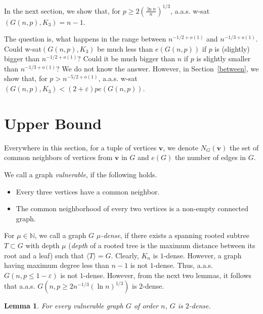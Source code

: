 \documentclass[]{article}
\newtheorem{lemma}[theorem]{Lemma}
\begin{document}
In the next section, we show that, for $p\geq 2\left(\frac{\ln n}{n}\right)^{1/3}$, a.a.s. w-sat$(G(n,p),K_3)=n-1$. 

The question is, what happens in the range between $n^{-1/2+o(1)}$ and $n^{-1/3+o(1)}$. Could w-sat$(G(n,p),K_3)$ be much less than $e(G(n,p))$ if $p$ is (slightly) bigger than $n^{-1/2+o(1)}$? Could it be much bigger than $n$ if $p$ is slightly smaller than $n^{-1/3+o(1)}$? We do not know the answer. However, in Section~\ref{between}, we show that, for $p>n^{-5/2+o(1)}$, a.a.s. w-sat$(G(n,p),K_3)<(2+\varepsilon)p e(G(n,p))$.


 
 
 \section{Upper Bound}
 \label{upper}
 
 Everywhere in this section, for a tuple of vertices $\mathbf{v}$, we denote $N_G(\mathbf{v})$ the set of common neighbors of vertices from $\mathbf{v}$ in $G$ and $e(G)$ the number of edges in $G$.
 
 We call a graph {\it vulnerable}, if the following holds.
 
\begin{itemize}
	\item  Every three vertices have a common neighbor.
	\item The common neighborhood of every two vertices is a non-empty connected graph.
\end{itemize} 

For $\mu\in\mathbb{N}$, we call a graph $G$ {\it $\mu$-dense}, if there exists a spanning rooted subtree $T\subset G$ with depth $\mu$ ({\it depth} of a rooted tree is the maximum distance between its root and a leaf) such that $\langle T\rangle=G$.
Clearly, $K_n$ is $1$-dense. However, a graph having maximum degree less than $n-1$ is not $1$-dense. %
Thus, a.a.s. $G(n,p\leq 1-\varepsilon)$ is not $1$-dense. However, from the next two lemmas, it follows that a.a.s. $G(n,p\geq 2n^{-1/3} (\ln n)^{1/3})$ is $2$-dense.

\begin{lemma}
	For every vulnerable graph $G$ of order $n$, $G$ is $2$-dense.
\label{lem_upper}
\end{lemma}
\end{document}
